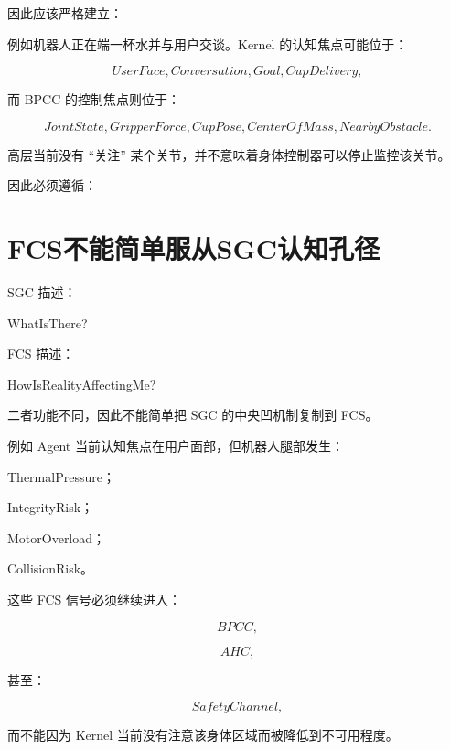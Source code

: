 因此应该严格建立：

\begin{statementbox}
\centering
{}
\end{statementbox}

例如机器人正在端一杯水并与用户交谈。Kernel 的认知焦点可能位于：

\[
UserFace,
Conversation,
Goal,
CupDelivery,
\]

而 BPCC 的控制焦点则位于：

\[
JointState,
GripperForce,
CupPose,
CenterOfMass,
NearbyObstacle.
\]

高层当前没有 ``关注'' 某个关节，并不意味着身体控制器可以停止监控该关节。

因此必须遵循：

\begin{statementbox}
\centering
{}
\end{statementbox}

\section{FCS不能简单服从SGC认知孔径}

SGC 描述：

\begin{statementbox}
WhatIsThere?
\end{statementbox}

FCS 描述：

\begin{statementbox}
HowIsRealityAffectingMe?
\end{statementbox}

二者功能不同，因此不能简单把 SGC 的中央凹机制复制到 FCS。

例如 Agent 当前认知焦点在用户面部，但机器人腿部发生：

ThermalPressure；

IntegrityRisk；

MotorOverload；

CollisionRisk。

这些 FCS 信号必须继续进入：

\[
BPCC,
\]

\[
AHC,
\]

甚至：

\[
SafetyChannel,
\]

而不能因为 Kernel 当前没有注意该身体区域而被降低到不可用程度。

